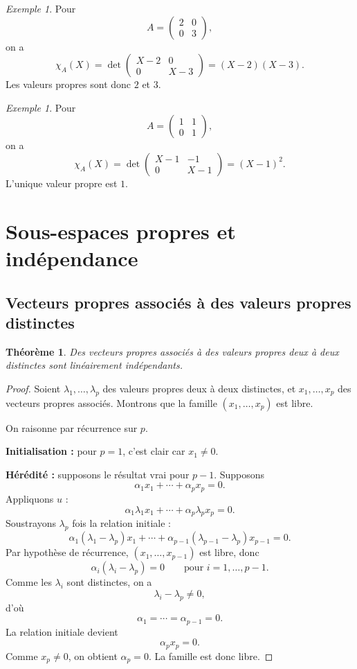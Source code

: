 \documentclass[11pt,a4paper]{article}
\newtheorem{theoreme}[definition]{Théorème}
\theoremstyle{remark}
\newtheorem{exemple}[definition]{Exemple}
\newcommand{\chiA}{\chi_A}
\begin{document}
\begin{exemple}
Pour
\[
A=
\begin{pmatrix}
2 & 0\\
0 & 3
\end{pmatrix},
\]
on a
\[
\chiA(X)=\det\begin{pmatrix}
X-2 & 0\\
0 & X-3
\end{pmatrix}
=(X-2)(X-3).
\]
Les valeurs propres sont donc \(2\) et \(3\).
\end{exemple}

\begin{exemple}
Pour
\[
A=
\begin{pmatrix}
1 & 1\\
0 & 1
\end{pmatrix},
\]
on a
\[
\chiA(X)=\det\begin{pmatrix}
X-1 & -1\\
0 & X-1
\end{pmatrix}
=(X-1)^2.
\]
L’unique valeur propre est \(1\).
\end{exemple}

\section{Sous-espaces propres et indépendance}

\subsection{Vecteurs propres associés à des valeurs propres distinctes}

\begin{theoreme}
Des vecteurs propres associés à des valeurs propres deux à deux distinctes sont linéairement indépendants.
\end{theoreme}

\begin{proof}
Soient \(\lambda_1,\dots,\lambda_p\) des valeurs propres deux à deux distinctes, et \(x_1,\dots,x_p\) des vecteurs propres associés. Montrons que la famille \((x_1,\dots,x_p)\) est libre.

On raisonne par récurrence sur \(p\).

\textbf{Initialisation :} pour \(p=1\), c’est clair car \(x_1\neq 0\).

\textbf{Hérédité :} supposons le résultat vrai pour \(p-1\). Supposons
\[
\alpha_1x_1+\cdots+\alpha_px_p=0.
\]
Appliquons \(u\) :
\[
\alpha_1\lambda_1x_1+\cdots+\alpha_p\lambda_px_p=0.
\]
Soustrayons \(\lambda_p\) fois la relation initiale :
\[
\alpha_1(\lambda_1-\lambda_p)x_1+\cdots+\alpha_{p-1}(\lambda_{p-1}-\lambda_p)x_{p-1}=0.
\]
Par hypothèse de récurrence, \((x_1,\dots,x_{p-1})\) est libre, donc
\[
\alpha_i(\lambda_i-\lambda_p)=0
\qquad \text{pour } i=1,\dots,p-1.
\]
Comme les \(\lambda_i\) sont distinctes, on a
\[
\lambda_i-\lambda_p\neq 0,
\]
d’où
\[
\alpha_1=\cdots=\alpha_{p-1}=0.
\]
La relation initiale devient
\[
\alpha_px_p=0.
\]
Comme \(x_p\neq 0\), on obtient \(\alpha_p=0\). La famille est donc libre.
\end{proof}
\end{document}

